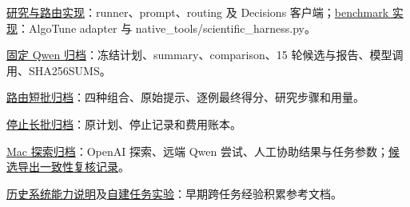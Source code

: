 \begin{description}[style=nextline,leftmargin=2.8em,labelwidth=2.5em,itemsep=6pt]
\item[S1] \href{\repo/tree/\snap/backend/src/routeevo/agent}{研究与路由实现}：runner、prompt、routing 及 Decisions 客户端；\href{\repo/tree/\snap/backend/src/routeevo/benchmarks}{benchmark 实现}：AlgoTune adapter 与 native\_tools/scientific\_harness.py。
\item[S2] \href{\repo/tree/\snap/docs/research/native-formal-20261114/ale/results}{固定 Qwen 归档}：冻结计划、summary、comparison、15 轮候选与报告、模型调用、SHA256SUMS。
\item[S3] \href{\repo/tree/\snap/docs/research/native-routing/20261114/short-results}{路由短批归档}：四种组合、原始提示、逐例最终得分、研究步骤和用量。
\item[S4] \href{\repo/tree/\snap/docs/research/native-routing/20261114/long-batch-stopped}{停止长批归档}：原计划、停止记录和费用账本。
\item[S5] \href{\repo/tree/5962203315dc1c229cd6ef3255d06e2dc5745436/docs/research/mac-exploratory-20261114}{Mac 探索归档}：OpenAI 探索、远端 Qwen 尝试、人工协助结果与任务参数；\href{\repo/pull/20#issuecomment-6875817264}{候选导出一致性复核记录}。
\item[S6] \href{\repo/blob/\snap/docs/project-description.md}{历史系统能力说明}及\href{\repo/blob/\snap/docs/results.md}{自建任务实验}：早期跨任务经验积累参考文档。
\end{description}
